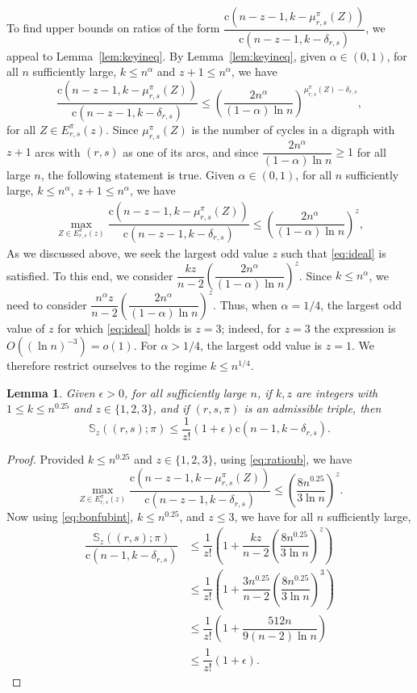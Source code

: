 \documentclass{amsart}
\newtheorem{lem}[thm]{Lemma}
\newcommand{\bb}{\mathbb}
\newcommand{\st}{\mathrm{c}}
\begin{document}
To find upper bounds on ratios of the form $\dfrac{\st(n-z-1,k-\mu_{r,s}^{\pi}(Z))}{\st(n-z-1,k-\delta_{r,s})}$, we appeal to Lemma~\ref{lem:keyineq}. By Lemma~\ref{lem:keyineq}, given $\alpha\in (0,1)$, for all $n$ sufficiently large, $k\leq n^{\alpha}$ and $z+1\leq n^{\alpha}$, we have
\[\dfrac{\st(n-z-1,k-\mu_{r,s}^{\pi}(Z))}{\st(n-z-1,k-\delta_{r,s})} \leq \left(\dfrac{2n^{\alpha}}{(1-\alpha)\ln n }\right)^{\mu_{r,s}^{\pi}(Z)-\delta_{r,s}},\] 
for all $Z\in E_{r,s}^{\pi}(z)$.
Since $\mu_{r,s}^{\pi}(Z)$ is the number of cycles in a digraph with $z+1$ arcs with $(r,s)$ as one of its arcs, and since $\dfrac{2n^{\alpha}}{(1-\alpha)\ln n }\geq 1$ for all large $n$, the following statement is true. Given $\alpha\in (0,1)$, for all $n$ sufficiently large, $k\leq n^{\alpha}$, $z+1\leq n^{\alpha}$, we have
\begin{align}\label{eq:ratioub}
\max\limits_{Z \in E_{r,s}^{\pi}(z)} \dfrac{\st(n-z-1,k-\mu_{r,s}^{\pi}(Z))}{\st(n-z-1,k-\delta_{r,s})} \leq \left(\dfrac{2n^{\alpha}}{(1-\alpha)\ln n }\right)^{z}, 
\end{align}
As we discussed above, we seek the largest odd value $z$ such that \eqref{eq:ideal} is satisfied. To this end, we consider $\dfrac{kz}{n-2}\left(\dfrac{2n^{\alpha}}{(1-\alpha)\ln n }\right)^{z}$. Since $k\leq n^{\alpha}$, we need to consider $\dfrac{n^{\alpha}z}{n-2}\left(\dfrac{2n^{\alpha}}{(1-\alpha)\ln n }\right)^{z}$. Thus, when $\alpha=1/4$, the largest odd value of $z$ for which \eqref{eq:ideal} holds is $z=3$; indeed, for $z=3$ the expression is $O((\ln n)^{-3})=o(1)$. For $\alpha>1/4$, the largest odd value is $z=1$. We therefore restrict ourselves to the regime $k\leq n^{1/4}$. 

\begin{lem}\label{lem:bonfub}
Given $\epsilon>0$, for all sufficiently large $n$, if $k,z$ are integers with $1\leq k\leq n^{0.25}$ and $z\in \{1,2,3\}$, and if $(r,s,\pi)$ is an admissible triple, then
\[\bb{S}_{z}((r,s);\pi) \leq \dfrac{1}{z!} ( 1+\epsilon)\st(n-1,k-\delta_{r,s}).\]
\end{lem}
\begin{proof}
Provided $k\leq n^{0.25}$ and $z\in \{1,2,3\}$, using \eqref{eq:ratioub}, we have 
\[\max\limits_{Z \in E_{r,s}^{\pi}(z)} \dfrac{\st(n-z-1,k-\mu_{r,s}^{\pi}(Z))}{\st(n-z-1,k-\delta_{r,s})} \leq \left(\dfrac{8n^{0.25}}{3\ln n }\right)^{z}.\] Now using \eqref{eq:bonfubint}, $k\leq n^{0.25}$, and $z\leq 3$, we have for all $n$ sufficiently large,
\begin{align*}
\dfrac{\bb{S}_{z}((r,s);\pi)}{\st(n-1,k-\delta_{r,s})}& \leq \dfrac{1}{z!}\left(1 + \dfrac{kz}{n-2} \left(\dfrac{8n^{0.25}}{3\ln n }\right)^{z}\right) \\
& \leq \dfrac{1}{z!}\left(1 + \dfrac{3n^{0.25}}{n-2} \left(\dfrac{8n^{0.25}}{3\ln n }\right)^{3}\right)\\
& \leq \dfrac{1}{z!}\left(1 + \dfrac{512 n}{9 (n-2) \ln n }\right)\\
&\leq \dfrac{1}{z!}\left(1 + \epsilon \right). 
\end{align*} 
\end{proof}
\end{document}
